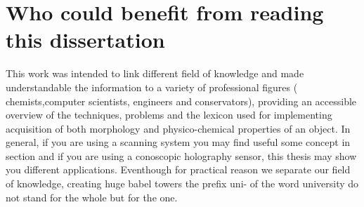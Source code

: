 \section*{Who could benefit from reading this dissertation}
This work was intended to link different field of knowledge and made understandable the information to a variety of professional figures ( chemists,computer scientists, engineers and conservators), providing an accessible overview of the techniques, problems and the lexicon used for implementing acquisition of both morphology and physico-chemical properties of an object. In general, if you are using a scanning system you may find useful some concept in section and if you are using a conoscopic holography sensor, this thesis may show you different applications.
Eventhough for practical reason we separate our field of knowledge, creating huge babel towers the prefix uni- of the word university do not stand for the whole but for the one.